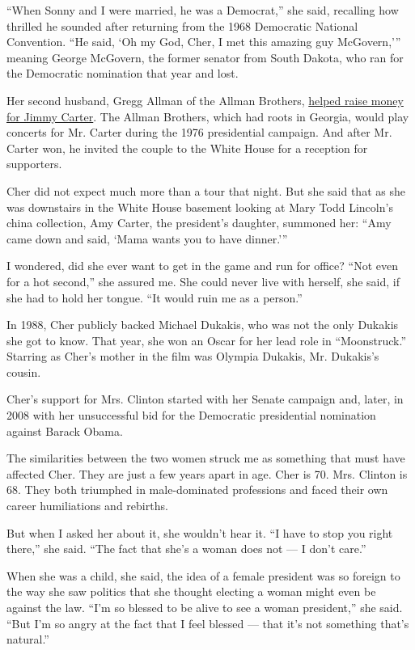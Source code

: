 ``When Sonny and I were married, he was a Democrat,'' she said,
recalling how thrilled he sounded after returning from the 1968
Democratic National Convention. ``He said, `Oh my God, Cher, I met this
amazing guy McGovern,''' meaning George McGovern, the former senator
from South Dakota, who ran for the Democratic nomination that year and
lost.

Her second husband, Gregg Allman of the Allman Brothers,
\href{https://www.theguardian.com/music/2012/oct/30/jimmy-carter-president-interview}{helped
raise money for Jimmy Carter}. The Allman Brothers, which had roots in
Georgia, would play concerts for Mr. Carter during the 1976 presidential
campaign. And after Mr. Carter won, he invited the couple to the White
House for a reception for supporters.

Cher did not expect much more than a tour that night. But she said that
as she was downstairs in the White House basement looking at Mary Todd
Lincoln's china collection, Amy Carter, the president's daughter,
summoned her: ``Amy came down and said, `Mama wants you to have
dinner.'''

I wondered, did she ever want to get in the game and run for office?
``Not even for a hot second,'' she assured me. She could never live with
herself, she said, if she had to hold her tongue. ``It would ruin me as
a person.''

In 1988, Cher publicly backed Michael Dukakis, who was not the only
Dukakis she got to know. That year, she won an Oscar for her lead role
in ``Moonstruck.'' Starring as Cher's mother in the film was Olympia
Dukakis, Mr. Dukakis's cousin.

Cher's support for Mrs. Clinton started with her Senate campaign and,
later, in 2008 with her unsuccessful bid for the Democratic presidential
nomination against Barack Obama.

The similarities between the two women struck me as something that must
have affected Cher. They are just a few years apart in age. Cher is 70.
Mrs. Clinton is 68. They both triumphed in male-dominated professions
and faced their own career humiliations and rebirths.

But when I asked her about it, she wouldn't hear it. ``I have to stop
you right there,'' she said. ``The fact that she's a woman does not ---
I don't care.''

When she was a child, she said, the idea of a female president was so
foreign to the way she saw politics that she thought electing a woman
might even be against the law. ``I'm so blessed to be alive to see a
woman president,'' she said. ``But I'm so angry at the fact that I feel
blessed --- that it's not something that's natural.''

